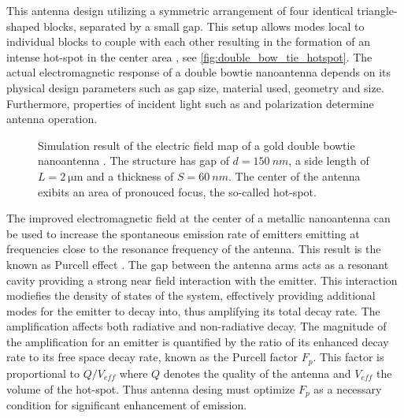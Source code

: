 		This antenna design utilizing a symmetric arrangement of four identical triangle-shaped blocks, separated by a small gap. This setup allows \LSP modes local to individual blocks to couple with each other resulting in the formation of an intense hot-spot in the center area \cite{nancy::85}, see \autoref{fig:double_bow_tie_hotspot}. The actual electromagnetic response of a double bowtie nanoantenna depends on its physical design parameters such as gap size, material used, geometry and size. Furthermore, properties of incident light such as \wl and polarization determine antenna operation.

		\begin{figure}[thp]
				\centering
				\label{fig::double_bow_tie_hotspot}
				\caption[Hot-spot of a double bowtie antenna]{Simulation result of the electric field map of a gold double bowtie nanoantenna \cite{nancy::thesis, Rahbany2015, Rahbany2016}. The structure has gap of $d = \SI{150}{nm}$, a side length of $L = \SI{2}{\micro\meter}$ and a thickness of $S = \SI{60}{nm}$. The center of the antenna exibits an area of pronouced focus, the so-called hot-spot.}
		\end{figure}


		The improved electromagnetic field at the center of a metallic nanoantenna can be used to increase the spontaneous emission rate of emitters emitting at frequencies close to the resonance frequency of the antenna. This result is the known as Purcell effect \cite{nancy::86}. The gap between the antenna arms acts as a resonant cavity providing a strong near field interaction with the emitter. This interaction modiefies the density of states of the system, effectively providing additional modes for the emitter to decay into, thus amplifying its total decay rate. The amplification affects both radiative and non-radiative decay.
		The magnitude of the amplification for an emitter is quantified by the ratio of its enhanced decay rate to its free space decay rate, known as the Purcell factor $F_p$. This factor is proportional to $Q/V_{eff}$ where $Q$ denotes the quality of the antenna and $V_{eff}$ the volume of the hot-spot. Thus antenna desing must optimize $F_p$ as a necessary condition for significant enhancement of \fl emission.

